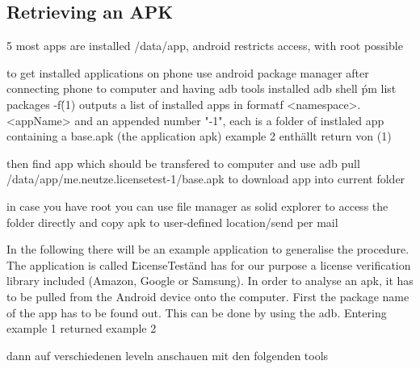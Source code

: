 \subsection{Retrieving an APK} \label{subsection:tools-apk}
5
most apps are installed /data/app, android restricts access, with root possible

to get installed applications on phone use android package manager
after connecting phone to computer and having \gls{adb} tools installed
adb shell \'pm list packages -f\' (1)
outputs a list of installed apps in formatf <namespace>.<appName> and an appended number "-1", each is a folder of instlaled app containing a base.apk (the application apk)
example 2 enthällt return von (1)

then find app which should be transfered to computer and use
adb pull /data/app/me.neutze.licensetest-1/base.apk
to download app into current folder

in case you have root you can use file manager as solid explorer to access the folder directly and copy apk to user-defined location/send per mail


\cite{munteanLicense}
%

In the following there will be an example application to generalise the procedure. The application is called \"LicenseTest\" and has for our purpose a license verification library included (Amazon, Google or Samsung).\newline
In order to analyse an \gls{apk}, it has to be pulled from the Android device onto the computer. First the package name of the app has to be found out. This can be done by using the \gls{adb}. Entering example 1 returned example 2

dann auf verschiedenen leveln anschauen mit den folgenden tools
